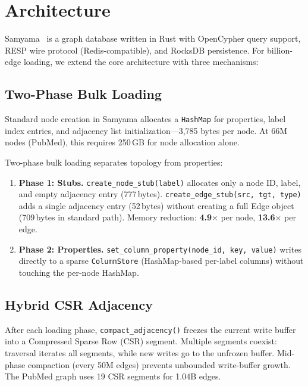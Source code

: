 \documentclass[11pt]{article}
\begin{document}
\section{Architecture}
\label{sec:arch}

Samyama~\citep{mandarapu2026samyama} is a graph database written in Rust with OpenCypher query support, RESP wire protocol (Redis-compatible), and RocksDB persistence. For billion-edge loading, we extend the core architecture with three mechanisms:

\subsection{Two-Phase Bulk Loading}
\label{sec:bulk-loading}

Standard node creation in Samyama allocates a \texttt{HashMap} for properties, label index entries, and adjacency list initialization---3,785 bytes per node. At 66M nodes (PubMed), this requires 250\,GB for node allocation alone.

Two-phase bulk loading separates topology from properties:

\begin{enumerate}[leftmargin=*]
  \item \textbf{Phase 1: Stubs.} \texttt{create\_node\_stub(label)} allocates only a node ID, label, and empty adjacency entry (777\,bytes). \texttt{create\_edge\_stub(src, tgt, type)} adds a single adjacency entry (52\,bytes) without creating a full Edge object (709\,bytes in standard path). Memory reduction: \textbf{4.9$\times$} per node, \textbf{13.6$\times$} per edge.
  \item \textbf{Phase 2: Properties.} \texttt{set\_column\_property(node\_id, key, value)} writes directly to a sparse \texttt{ColumnStore} (HashMap-based per-label columns) without touching the per-node HashMap.
\end{enumerate}

\subsection{Hybrid CSR Adjacency}
\label{sec:csr}

After each loading phase, \texttt{compact\_adjacency()} freezes the current write buffer into a Compressed Sparse Row (CSR) segment. Multiple segments coexist: traversal iterates all segments, while new writes go to the unfrozen buffer. Mid-phase compaction (every 50M edges) prevents unbounded write-buffer growth. The PubMed graph uses 19 CSR segments for 1.04B edges.
\end{document}
